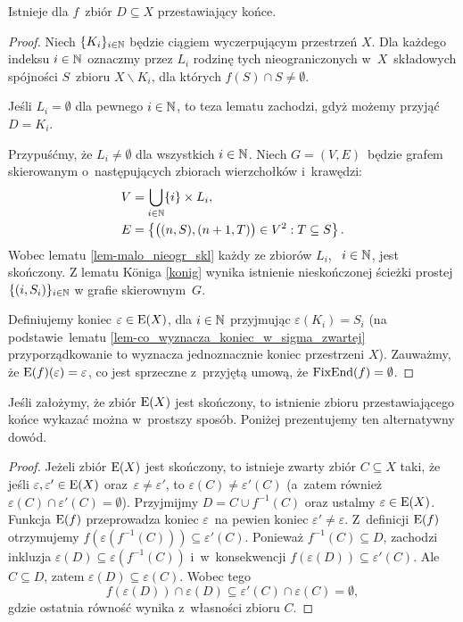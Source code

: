 \begin{lem}\label{lem-zbi_odd_skl}
Istnieje dla $f$~zbiór $D\subseteq X$ przestawiający końce.
\end{lem}
\begin{proof}
Niech $\{K_i\}_{i\in \mathbb{N}}$ będzie ciągiem wyczerpującym przestrzeń $X$. Dla każdego indeksu $i\in\mathbb{N}$ oznaczmy przez $L_i$ rodzinę tych nieograniczonych w~$X$~składowych spójności $S$~zbioru $X\smallsetminus K_i$, dla których $f(S)\cap S\not=\emptyset$.

Jeśli $L_i=\emptyset$ dla pewnego $i\in\mathbb{N}$, to teza lematu zachodzi, gdyż możemy przyjąć $D=K_i$.

Przypuśćmy, że $L_i\not=\emptyset$ dla wszystkich $i\in\mathbb{N}$.
Niech $G=(V,E)$~będzie grafem skierowanym o~następujących zbiorach wierzchołków i~krawędzi: \begin{align*}V&=\bigcup_{i\in\mathbb{N}}\{i\}\times L_i, \\ E&=\left\{\big((n,S),(n+1,T)\big)\in V^2 : T\subseteq S\right\}.\end{align*} Wobec lematu \ref{lem-malo_nieogr_skl} każdy ze zbiorów $L_i$, ~$i\in\mathbb{N}$, jest skończony. Z lematu K{\"o}niga \ref{konig} wynika istnienie nieskończonej ścieżki prostej $\{(i,S_i)\}_{i\in\mathbb{N}}$ w grafie skierownym~$G$.

Definiujemy koniec $\varepsilon\in \mathrm{E}(X)$, dla $i\in\mathbb{N}$ przyjmując $\varepsilon(K_i)=S_i$ (na podstawie~lematu \ref{lem-co_wyznacza_koniec_w_sigma_zwartej} przyporządkowanie to wyznacza jednoznacznie koniec przestrzeni $X$). Zauważmy, że $\mathrm{E}(f)(\varepsilon)=\varepsilon$, co jest sprzeczne z~przyjętą umową, że $\operatorname{FixEnd}(f)=\emptyset$.
\end{proof}

\begin{uw}\label{uw-zbi_odd_skl}
Jeśli założymy, że zbiór $\mathrm{E}(X)$ jest skończony, to istnienie zbioru przestawiającego końce wykazać można w~prostszy sposób. Poniżej prezentujemy ten alternatywny dowód.
\end{uw}
\begin{proof}
Jeżeli zbiór $\mathrm{E}(X)$ jest skończony, to istnieje zwarty zbiór $C\subseteq X$ taki, że jeśli $\varepsilon,\varepsilon'\in \mathrm{E}(X)$ oraz~$\varepsilon\not=\varepsilon'$, to $\varepsilon(C)\not=\varepsilon'(C)$ (a~zatem również $\varepsilon(C)\cap \varepsilon'(C)=\emptyset$). Przyjmijmy $D=C\cup f^{-1}(C)$ oraz ustalmy $\varepsilon\in \mathrm{E}(X)$. Funkcja $\mathrm{E}(f)$ przeprowadza koniec $\varepsilon$~na pewien koniec $\varepsilon'\not=\varepsilon$. Z~definicji $\mathrm{E}(f)$ otrzymujemy $f\left(\varepsilon\left(f^{-1}(C)\right)\right)\subseteq \varepsilon'(C)$. Ponieważ $f^{-1}(C)\subseteq D$, zachodzi inkluzja $\varepsilon(D)\subseteq \varepsilon\left(f^{-1}(C)\right)$ i~w~konsekwencji $f(\varepsilon(D))\subseteq \varepsilon'(C)$. Ale $C\subseteq D$, zatem $\varepsilon(D)\subseteq \varepsilon(C)$. Wobec tego \[f(\varepsilon(D))\cap\varepsilon(D)\subseteq \varepsilon'(C)\cap \varepsilon(C)=\emptyset,\] gdzie ostatnia równość wynika z~własności zbioru $C$.
\end{proof}

